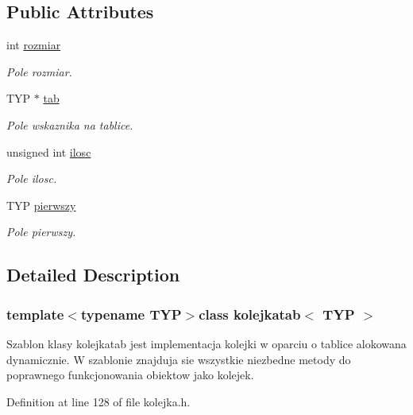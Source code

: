 \subsection*{Public Attributes}
\begin{DoxyCompactItemize}
\item 
int \hyperlink{classkolejkatab_a77ad076380322b9698305c608aab6637}{rozmiar}
\begin{DoxyCompactList}\small\item\em Pole rozmiar. \end{DoxyCompactList}\item 
T\-Y\-P $\ast$ \hyperlink{classkolejkatab_a91ec1706d1e10ce7f781a5102c4b59b8}{tab}
\begin{DoxyCompactList}\small\item\em Pole wskaznika na tablice. \end{DoxyCompactList}\item 
unsigned int \hyperlink{classkolejkatab_a161d4a2c4e17bd942ca79ae3a421ff34}{ilosc}
\begin{DoxyCompactList}\small\item\em Pole ilosc. \end{DoxyCompactList}\item 
T\-Y\-P \hyperlink{classkolejkatab_a9eac0eb1ac26bedc608938e7865b6352}{pierwszy}
\begin{DoxyCompactList}\small\item\em Pole pierwszy. \end{DoxyCompactList}\end{DoxyCompactItemize}


\subsection{Detailed Description}
\subsubsection*{template$<$typename T\-Y\-P$>$class kolejkatab$<$ T\-Y\-P $>$}

Szablon klasy kolejkatab jest implementacja kolejki w oparciu o tablice alokowana dynamicznie. W szablonie znajduja sie wszystkie niezbedne metody do poprawnego funkcjonowania obiektow jako kolejek. 

Definition at line 128 of file kolejka.\-h.



